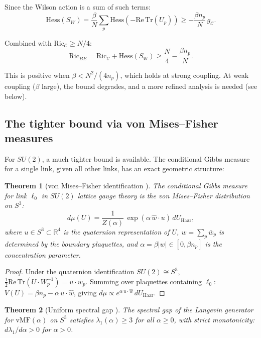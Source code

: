 \documentclass[11pt]{article}
\newtheorem{theorem}{Theorem}[section]
\theoremstyle{definition}
\newcommand{\calC}{\mathcal{C}}
\newcommand{\Ric}{\mathrm{Ric}}
\newcommand{\Hess}{\mathrm{Hess}}
\newcommand{\Tr}{\mathrm{Tr}}
\newcommand{\R}{\mathbb{R}}
\begin{document}
Since the Wilson action is a sum of such terms:
\begin{equation}
    \Hess(S_W) = \frac{\beta}{N} \sum_p \Hess(-\mathrm{Re}\,\Tr(U_p)) \geq -\frac{\beta n_p}{N}\, g_\calC.
\end{equation}

Combined with $\Ric_\calC \geq N/4$:
\begin{equation}
    \Ric_{BE} = \Ric_\calC + \Hess(S_W) \geq \frac{N}{4} - \frac{\beta n_p}{N}.
\end{equation}

This is positive when $\beta < N^2/(4n_p)$, which holds at strong coupling. At weak coupling ($\beta$ large), the bound degrades, and a more refined analysis is needed (see below).

\subsection{The tighter bound via von Mises--Fisher measures}

For $SU(2)$, a much tighter bound is available. The conditional Gibbs measure for a single link, given all other links, has an exact geometric structure:

\begin{theorem}[von Mises--Fisher identification \cite{BenShalom26}]\label{thm:vmf}
The conditional Gibbs measure for link $\ell_0$ in $SU(2)$ lattice gauge theory is the von Mises--Fisher distribution on $S^3$:
\begin{equation}
    d\mu(U) = \frac{1}{Z(\alpha)}\, \exp(\alpha\, \hat{w} \cdot u)\, dU_{\mathrm{Haar}},
\end{equation}
where $u \in S^3 \subset \R^4$ is the quaternion representation of $U$, $w = \sum_p \bar{w}_p$ is determined by the boundary plaquettes, and $\alpha = \beta|w| \in [0, \beta n_p]$ is the concentration parameter.
\end{theorem}

\begin{proof}
Under the quaternion identification $SU(2) \cong S^3$, $\frac{1}{2}\mathrm{Re}\,\Tr(U \cdot W_p^{-1}) = u \cdot \bar{w}_p$. Summing over plaquettes containing $\ell_0$: $V(U) = \beta n_p - \alpha\, u \cdot \hat{w}$, giving $d\mu \propto e^{\alpha\, u \cdot \hat{w}}\, dU_{\mathrm{Haar}}$.
\end{proof}

\begin{theorem}[Uniform spectral gap \cite{BenShalom26}]\label{thm:uniform-gap}
The spectral gap of the Langevin generator for $\mathrm{vMF}(\alpha)$ on $S^3$ satisfies $\lambda_1(\alpha) \geq 3$ for all $\alpha \geq 0$, with strict monotonicity: $d\lambda_1/d\alpha > 0$ for $\alpha > 0$.
\end{theorem}
\end{document}
